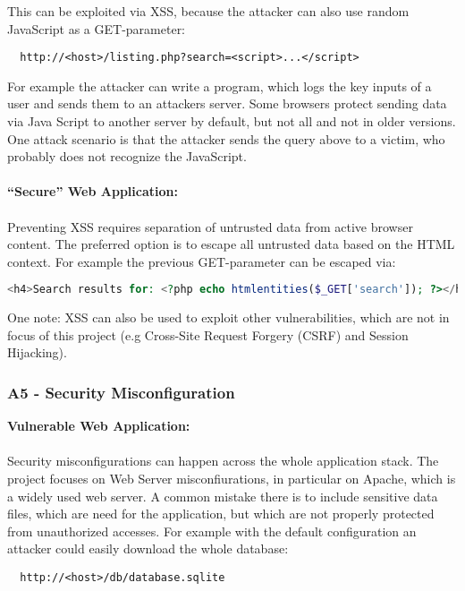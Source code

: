 This can be exploited via XSS, because the attacker can also use random JavaScript as a GET-parameter:

\begin{lstlisting}
  http://<host>/listing.php?search=<script>...</script>
\end{lstlisting}

For example the attacker can write a program, which logs the key inputs of a user and sends them to an attackers server. Some browsers protect sending data via Java Script to another server by default, but not all and not in older versions. One attack scenario is that the attacker sends the query above to a victim, who probably does not recognize the JavaScript.\\
\\
\textbf{``Secure'' Web Application:}\\
\\
Preventing XSS requires separation of untrusted data from active browser content. The preferred option is to escape all untrusted data based on the HTML context. For example the previous GET-parameter can be escaped via:

\begin{lstlisting}[language=PHP]
  <h4>Search results for: <?php echo htmlentities($_GET['search']); ?></h4>
\end{lstlisting}

One note: XSS can also be used to exploit other vulnerabilities, which are not in focus of this project (e.g Cross-Site Request Forgery (CSRF) and Session Hijacking).


\subsubsection{A5 - Security Misconfiguration}

\textbf{Vulnerable Web Application:} \\
\\
Security misconfigurations can happen across the whole application stack. The project focuses on Web Server misconfiurations, in particular on Apache, which is a widely used web server. A common mistake there is to include sensitive data files, which are need for the application, but which are not properly protected from unauthorized accesses. For example with the default configuration an attacker could easily download the whole database:

\begin{lstlisting}
  http://<host>/db/database.sqlite
\end{lstlisting}

